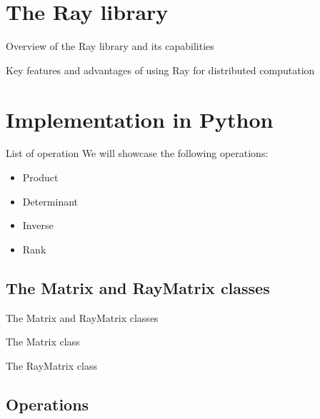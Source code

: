 \documentclass{beamer}
\begin{document}
\section{The Ray library}
\begin{frame}{Overview of the Ray library and its capabilities}

\end{frame}

\begin{frame}{Key features and advantages of using Ray for distributed computation}

\end{frame}

\section{Implementation in Python}
\begin{frame}{List of operation}
    We will showcase the following operations:
    \begin{itemize}
        \item{Product}
        \item{Determinant}
        \item{Inverse}
        \item{Rank}
    \end{itemize}
\end{frame}

\subsection{The Matrix and RayMatrix classes}
\begin{frame}{The Matrix and RayMatrix classes}

\end{frame}

\begin{frame}{The Matrix class}

\end{frame}

\begin{frame}{The RayMatrix class}

\end{frame}

\subsection{Operations}
\end{document}
